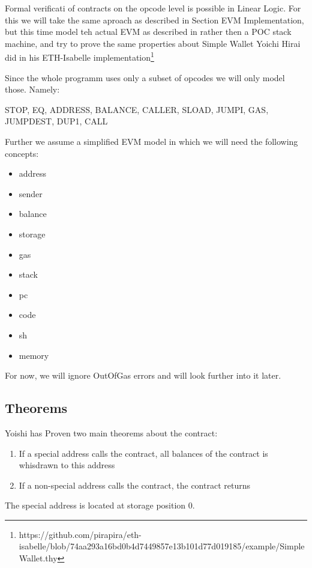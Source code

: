 
Formal verificati of contracts on the opcode level is possible in Linear Logic. For this we will take the same aproach as described in Section EVM Implementation, but this time model teh actual EVM as described in \cite{Wood2014} rather then a POC stack machine, and try to prove the same properties about Simple Wallet Yoichi Hirai did in his ETH-Isabelle implementation\footnote{https://github.com/pirapira/eth-isabelle/blob/74aa293a16bd0b4d7449857e13b101d77d019185/example/SimpleWallet.thy}

Since the whole programm uses only a subset of opcodes we will only model those. Namely:

 STOP, EQ, ADDRESS, BALANCE, CALLER, SLOAD, JUMPI, GAS, JUMPDEST, DUP1, CALL

Further we assume a simplified EVM model in which we will need the following concepts:

\begin{itemize}
  \item address
  \item sender
  \item balance
  \item storage
  \item gas
  \item stack
  \item pc
  \item code
  \item sh
  \item memory
\end{itemize}

For now, we will ignore OutOfGas errors and will look further into it later.

\subsection*{Theorems}
Yoishi has Proven two main theorems about the contract:

\begin{enumerate}
  \item If a special address calls the contract, all balances of the contract is whisdrawn to this address
  \item If a non-special address calls the contract, the contract returns
\end{enumerate}

The special address is located at storage position 0.



